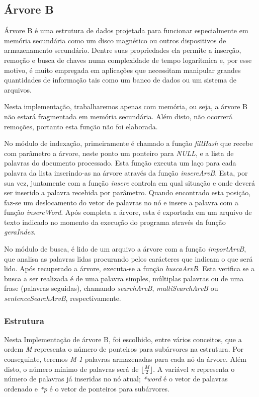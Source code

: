 \documentclass[
	11pt,				%
	oneside,			%
	a4paper,			%
	english,			%
	brazil,				%
	]{article}
\begin{document}
\subsection{Árvore B}
Árvore B é uma estrutura de dados projetada para funcionar especialmente em memória secundária como um disco magnético ou outros dispositivos de armazenamento secundário. Dentre suas propriedades ela permite a inserção, remoção e busca de chaves numa complexidade de tempo logarítmica e, por esse motivo, é muito empregada em aplicações que necessitam manipular grandes quantidades de informação tais como um banco de dados ou um sistema de arquivos. \cite{pesqprim}

Nesta implementação, trabalharemos apenas com memória, ou seja, a árvore B não estará fragmentada em memória secundária. Além disto, não ocorrerá remoções, portanto esta função não foi elaborada.

No módulo de indexação, primeiramente é chamado a função \textit{fillHash} que recebe com parâmetro a árvore, neste ponto um ponteiro para \textit{NULL}, e a lista de palavras do documento processado. Esta função executa um laço para cada palavra da lista inserindo-as na árvore através da função \textit{insereArvB}. Esta, por sua vez, juntamente com a função \textit{insere} controla em qual situação e onde deverá ser inserido a palavra recebida por parâmetro. Quando encontrado esta posição, faz-se um deslocamento do vetor de palavras no nó e insere a palavra com a função \textit{insereWord}. Após completa a árvore, esta é exportada em um arquivo de texto indicado no momento da execução do programa através da função \textit{geraIndex}.

No módulo de busca, é lido de um arquivo a árvore com a função \textit{importArvB}, que analisa as palavras lidas procurando pelos carácteres que indicam o que será lido. Após recuperado a árvore, executa-se a função \textit{buscaArvB}. Esta verifica se a busca a ser realizada é de uma palavra simples, múltiplas palavras ou de uma frase (palavras seguidas), chamando \textit{searchArvB}, \textit{multiSearchArvB} ou \textit{sentenceSearchArvB}, respectivamente.

\subsubsection{Estrutura}
Nesta Implementação de árvore B, foi escolhido, entre vários conceitos, que a ordem \textit{M} representa o número de ponteiros para subárvores na estrutura. Por conseguinte, teremos \textit{M-1} palavras armazenadas para cada nó da árvore. Além disto, o número mínimo de palavras será de $ \lfloor\frac{M}{2}\rfloor $. A variável \textit{n} representa o número de palavras já inseridas no nó atual; \textit{*word} é o vetor de palavras ordenado e \textit{*p} é o vetor de ponteiros para subárvores.
\end{document}
